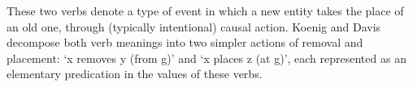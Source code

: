 \documentclass[output=paper
	        ,collection
	        ,collectionchapter
 	        ,biblatex
                ,babelshorthands
                ,newtxmath
                ,draftmode
                ,colorlinks, citecolor=brown
]{langscibook}
\begin{document}
These two verbs denote a type of event in which a new entity takes the place of an old one, through (typically intentional) causal action.
Koenig and Davis decompose both verb meanings into two simpler actions of removal and placement: `x removes y (from g)' and `x places z (at g)', each represented as an elementary predication in the  values of these verbs.  


\end{document}

